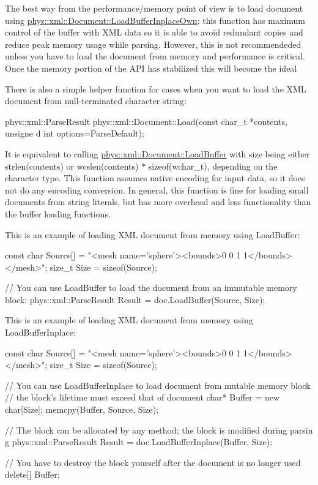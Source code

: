  \par
 The best way from the performance/memory point of view is to load document using \hyperlink{classphys_1_1xml_1_1Document_a9213b8bf4fa5423ea292a3d03c826608}{phys::xml::Document::LoadBufferInplaceOwn}; this function has maximum control of the buffer with XML data so it is able to avoid redundant copies and reduce peak memory usage while parsing. However, this is not recommendeded unless you have to load the document from memory and performance is critical. Once the memory portion of the API has stabilized this will become the ideal \par
 \par
 There is also a simple helper function for cases when you want to load the XML document from null-\/terminated character string: 
\begin{DoxyCode}
 phys::xml::ParseResult phys::xml::Document::Load(const char_t *contents, unsigne
      d int options=ParseDefault);
\end{DoxyCode}
 It is equivalent to calling \hyperlink{classphys_1_1xml_1_1Document_a31c36783e033d6d43d51e31a6dd4099f}{phys::xml::Document::LoadBuffer} with size being either strlen(contents) or wcslen(contents) $\ast$ sizeof(wchar\_\-t), depending on the character type. This function assumes native encoding for input data, so it does not do any encoding conversion. In general, this function is fine for loading small documents from string literals, but has more overhead and less functionality than the buffer loading functions. \par
 \par
 This is an example of loading XML document from memory using LoadBuffer: 
\begin{DoxyCode}
 const char Source[] = "<mesh name='sphere'><bounds>0 0 1 1</bounds></mesh>";
 size_t Size = sizeof(Source);

 // You can use LoadBuffer to load the document from an immutable memory block:
 phys::xml::ParseResult Result = doc.LoadBuffer(Source, Size);
\end{DoxyCode}
 This is an example of loading XML document from memory using LoadBufferInplace: 
\begin{DoxyCode}
 const char Source[] = "<mesh name='sphere'><bounds>0 0 1 1</bounds></mesh>";
 size_t Size = sizeof(Source);

 // You can use LoadBufferInplace to load document from mutable memory block
 // the block's lifetime must exceed that of document
 char* Buffer = new char[Size];
 memcpy(Buffer, Source, Size);

 // The block can be allocated by any method; the block is modified during parsin
      g
 phys::xml::ParseResult Result = doc.LoadBufferInplace(Buffer, Size);

 // You have to destroy the block yourself after the document is no longer used
 delete[] Buffer;
\end{DoxyCode}
